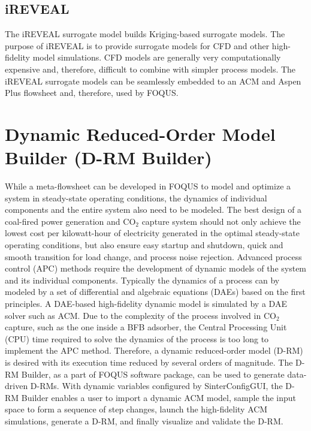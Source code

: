 \subsection{iREVEAL}

The iREVEAL surrogate model builds Kriging-based surrogate models. The purpose of iREVEAL is to provide surrogate models for CFD and other high-fidelity model simulations. CFD models are generally very computationally expensive and, therefore, difficult to combine with simpler process models. The iREVEAL surrogate models can be seamlessly embedded to an ACM and Aspen Plus flowsheet and, therefore, used by FOQUS.

\section{Dynamic Reduced-Order Model Builder (D-RM Builder)}

While a meta-flowsheet can be developed in FOQUS to model and optimize a system in steady-state operating conditions, the dynamics of individual components and the entire system also need to be modeled. The best design of a coal-fired power generation and CO$_2$ capture system should not only achieve the lowest cost per kilowatt-hour of electricity generated in the optimal steady-state operating conditions, but also ensure easy startup and shutdown, quick and smooth transition for load change, and process noise rejection.  Advanced process control (APC) methods require the development of dynamic models of the system and its individual components. Typically the dynamics of a process can by modeled by a set of differential and algebraic equations (DAEs) based on the first principles. A DAE-based high-fidelity dynamic model is simulated by a DAE solver such as ACM. Due to the complexity of the process involved in CO$_2$ capture, such as the one inside a BFB adsorber, the Central Processing Unit (CPU) time required to solve the dynamics of the process is too long to implement the APC method. Therefore, a dynamic reduced-order model (D-RM) is desired with its execution time reduced by several orders of magnitude.  The D-RM Builder, as a part of FOQUS software package, can be used to generate data-driven D-RMs. With dynamic variables configured by SinterConfigGUI, the D-RM Builder enables a user to import a dynamic ACM model, sample the input space to form a sequence of step changes, launch the high-fidelity ACM simulations, generate a D-RM, and finally visualize and validate the D-RM.




